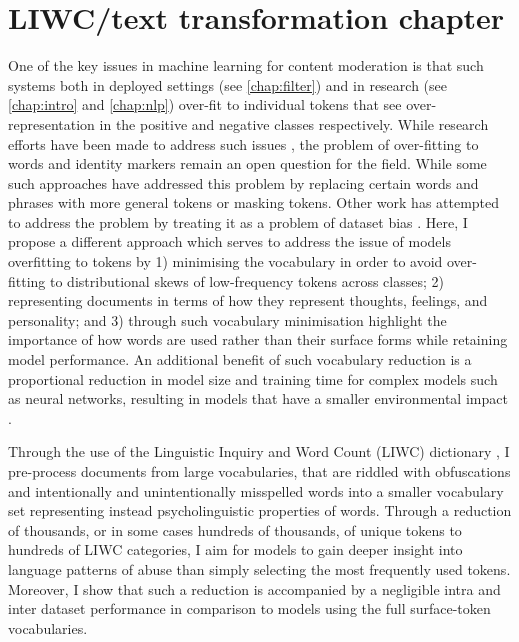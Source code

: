 \ifpdf
    \graphicspath{{Chapter4/Figs/Raster/}{Chapter4/Figs/PDF/}{Chapter4/Figs/}}
\else
    \graphicspath{{Chapter4/Figs/Vector/}{Chapter4/Figs/}}
\fi

\chapter{LIWC/text transformation chapter}\label{chap:liwc}

One of the key issues in machine learning for content moderation is that such systems both in deployed settings (see \autoref{chap:filter}) and in research (see \autoref{chap:intro} and \autoref{chap:nlp}) over-fit to individual tokens that see over-representation in the positive and negative classes respectively. While research efforts have been made to address such issues \cite{CITE: cite papers that try to address overfitting}, the problem of over-fitting to words and identity markers remain an open question for the field. While some such approaches have addressed this problem by replacing certain words and phrases with more general tokens \cite{CITE: Replacing token papers} or masking \cite{CITE: Masking token paper} tokens. Other work has attempted to address the problem by treating it as a problem of dataset bias \cite{Dixon:2018}. Here, I propose a different approach which serves to address the issue of models overfitting to tokens by 1) minimising the vocabulary in order to avoid over-fitting to distributional skews of low-frequency tokens across classes; 2) representing documents in terms of how they represent thoughts, feelings, and personality; and 3) through such vocabulary minimisation highlight the importance of how words are used rather than their surface forms while retaining model performance. An additional benefit of such vocabulary reduction is a proportional reduction in model size and training time for complex models such as neural networks, resulting in models that have a smaller environmental impact \citep{Strubell:2019}.

Through the use of the Linguistic Inquiry and Word Count (LIWC) dictionary \cite{LIWC:2015,Original LIWC Citation}, I pre-process documents from large vocabularies, that are riddled with obfuscations and intentionally and unintentionally misspelled words into a smaller vocabulary set representing instead psycholinguistic properties of words. Through a reduction of thousands, or in some cases hundreds of thousands, of unique tokens to hundreds of LIWC categories, I aim for models to gain deeper insight into language patterns of abuse than simply selecting the most frequently used tokens. Moreover, I show that such a reduction is accompanied by a negligible intra and inter dataset performance in comparison to models using the full surface-token vocabularies.

